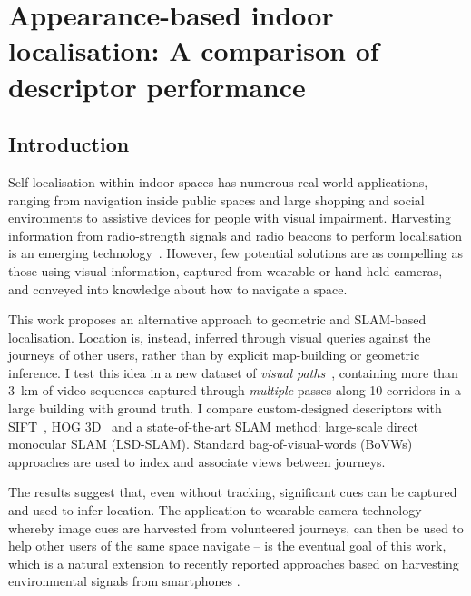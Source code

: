 \chapter{Appearance-based indoor localisation: A comparison of descriptor performance}\label{ch:chapter4} 

\section{Introduction}
\label{sec:intro}

Self-localisation within indoor spaces has numerous real-world applications, ranging from navigation inside public spaces and large shopping and social environments to assistive devices for people with visual impairment.   Harvesting information from radio-strength signals and radio beacons to perform localisation is an emerging technology~\cite{wang2012no,fallah2013indoor}.  However, few potential solutions are as compelling as those using  visual information,  captured from wearable or hand-held cameras, and conveyed into knowledge about how to navigate a space. 

This work proposes an alternative approach to geometric and SLAM-based localisation.  Location is, instead, inferred through visual queries against the journeys of other users, rather than by explicit map-building or geometric inference. 
I test this idea  in a new dataset of \emph{visual paths}~\cite{Rivera-RubioRSM}, containing  more than \SI{3}{km} of video sequences captured through {\em multiple} passes along 10 corridors  in a large building with ground truth. I compare custom-designed descriptors  with SIFT~\cite{lowe2004distinctive}, HOG 3D~\cite{Klaser2008} and a state-of-the-art SLAM method: large-scale direct monocular SLAM (LSD-SLAM).  Standard bag-of-visual-words (BoVWs) a\-pproach\-es are used to index and associate views between journeys. 

The results suggest that, even without tracking, significant cues can be captured and used to infer location.  The application to wearable camera technology -- whereby image cues are harvested from volunteered journeys, can then be used to help other users of the same space navigate -- is the eventual goal of this work, which is a natural extension to recently reported approaches based on harvesting environmental signals from smartphones \cite{Wang2012}.



